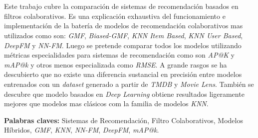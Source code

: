 \chapter*{\runtitulo}

\noindent Este trabajo cubre la comparación de sistemas de recomendación basados en filtros colaborativos. Es una explicación exhaustiva del funcionamiento e implementación de la batería de modelos de recomendación colaborativos mas utilizados como son: \textit{GMF}, \textit{Biased-GMF}, \textit{KNN Item Based}, \textit{KNN User Based}, \textit{DeepFM} y \textit{NN-FM}. Luego se pretende comparar todos los modelos utilizando métricas especialidades para sistemas de recomendación como son \textit{AP@K} y \textit{mAP@k} y otros menos especializada como \textit{RMSE}. A grande rasgos se ha descubierto que no existe una diferencia sustancial en precisión entre modelos entrenados con un \textit{dataset} generado a partir de \textit{TMDB} y \textit{Movie Lens}. También se descubre que modelo basados en \textit{Deep Learning} obtiene resultados ligeramente mejores que modelos mas clásicos com la familia de modelos \textit{KNN}. 

\bigskip

\noindent\textbf{Palabras claves:} Sistemas de Recomendación, Filtro Colaborativos, Modelos Híbridos, \textit{GMF}, \textit{KNN}, \textit{NN-FM}, \textit{DeepFM}, \textit{mAP@k}.
